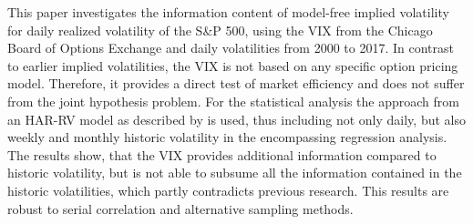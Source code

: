 
This paper investigates the information content of model-free implied volatility for daily realized volatility of the S\&P 500, using the \ac{VIX} from the Chicago Board of Options Exchange and daily volatilities from 2000 to 2017. In contrast to earlier implied volatilities, the VIX is not based on any specific option pricing model. Therefore, it provides a direct test of market efficiency and does not suffer from the joint hypothesis problem. For the statistical analysis the approach from an HAR-RV model as described by \textcite{corsi2009} is used, thus including not only daily, but also weekly and monthly historic volatility in the encompassing regression analysis. The results show, that the \ac{VIX} provides additional information compared to historic volatility, but is not able to subsume all the information contained in the historic volatilities, which partly contradicts previous research. This results are robust to serial correlation and alternative sampling methods. 